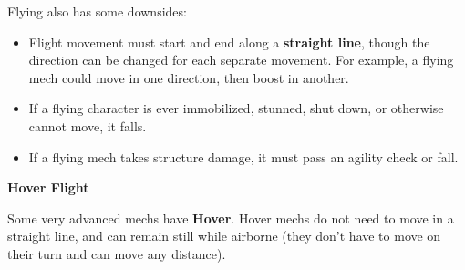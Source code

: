Flying also has some downsides:
\begin{itemize}
\item Flight movement must start and end along a \textbf{straight line}, though the direction can be changed for each separate movement. For example, a flying mech could move in one direction, then boost in another. 
\item If a flying character is ever immobilized, stunned, shut down, or otherwise cannot move, it falls.
\item If a flying mech takes structure damage, it must pass an agility check or fall.
\end{itemize}



\begin{center}
     \textbf{Hover Flight}
\end{center}

Some very advanced mechs have \textbf{Hover}. Hover mechs do not need to move in a straight line, and can remain still while airborne (they don't have to move on their turn and can move any distance).